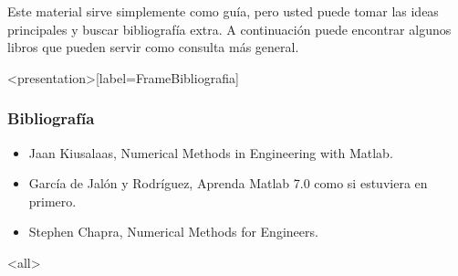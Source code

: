 Este material sirve simplemente como guía, pero usted puede tomar las ideas principales
y buscar bibliografía extra. A continuación puede encontrar algunos libros que pueden
servir como consulta más general.

\begin{figure}
\end{figure}

\mode*
\begin{frame}<presentation>[label=FrameBibliografia]
  \frametitle{Bibliografía}

  \begin{itemize}

    \item Jaan Kiusalaas, Numerical Methods in Engineering with Matlab.

    \item García de Jalón y Rodríguez, Aprenda Matlab 7.0 como si estuviera en primero.

    \item  Stephen Chapra, Numerical Methods for Engineers.

  \end{itemize}

\end{frame}

\mode<all>
